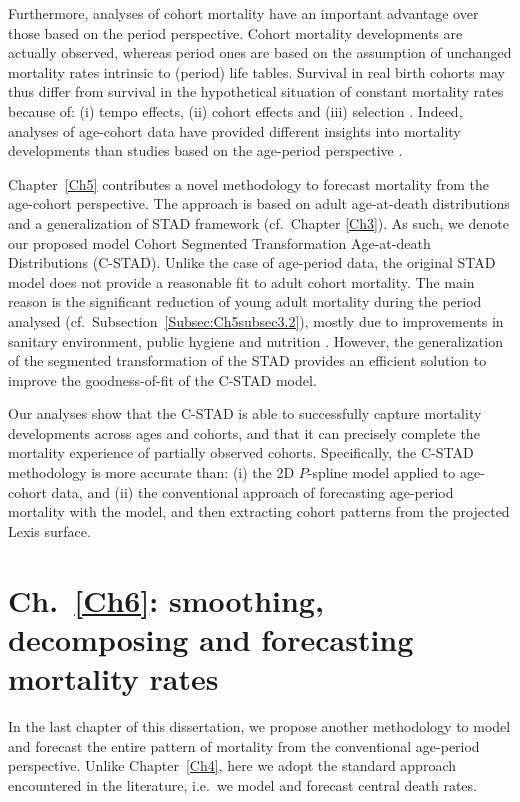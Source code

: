 \documentclass[Thesis]{subfiles}
\begin{document}
Furthermore, analyses of cohort mortality have an important advantage over those based on the period perspective. Cohort mortality developments are actually observed, whereas period ones are based on the assumption of unchanged mortality rates intrinsic to (period) life tables. Survival in real birth cohorts may thus differ from survival in the hypothetical situation of constant mortality rates because of: (i) tempo effects, (ii) cohort effects and (iii) selection \cite[for a full discussion, see][pp.~90--92]{borgan2019cohort}. Indeed, analyses of age-cohort data have provided different insights into mortality developments than studies based on the age-period perspective \cite[see, e.g.,][]{goldstein2006relationships,shkolnikov2011steep,borgan2019cohort,keilman2019mortality,nepomuceno2019cohort}.

Chapter~\ref{Ch5} contributes a novel methodology to forecast mortality from the age-cohort perspective. The approach is based on adult age-at-death distributions and a generalization of STAD framework (cf.~Chapter \ref{Ch3}). As such, we denote our proposed model Cohort Segmented Transformation Age-at-death Distributions (C-STAD). Unlike the case of age-period data, the original STAD model does not provide a reasonable fit to adult cohort mortality. The main reason is the significant reduction of young adult mortality during the period analysed (cf.~Subsection~\ref{Subsec:Ch5subsec3.2}), mostly due to improvements in sanitary environment, public hygiene and nutrition \citep{mckeown1976modern}. However, the generalization of the segmented transformation of the STAD provides an efficient solution to improve the goodness-of-fit of the C-STAD model.

Our analyses show that the C-STAD is able to successfully capture mortality developments across ages and cohorts, and that it can precisely complete the mortality experience of partially observed cohorts. Specifically, the C-STAD methodology is more accurate than: (i) the 2D $P$-spline model applied to age-cohort data, and (ii) the conventional approach of forecasting age-period mortality with the \cite{lee1992modeling} model, and then extracting cohort patterns from the projected Lexis surface.

\section{Ch.~\ref{Ch6}: smoothing, decomposing and forecasting mortality rates}\label{Sec:Ch1sec9}
In the last chapter of this dissertation, we propose another methodology to model and forecast the entire pattern of mortality from the conventional age-period perspective. Unlike Chapter~\ref{Ch4}, here we adopt the standard approach encountered in the literature, i.e.~we model and forecast central death rates.
\end{document}
